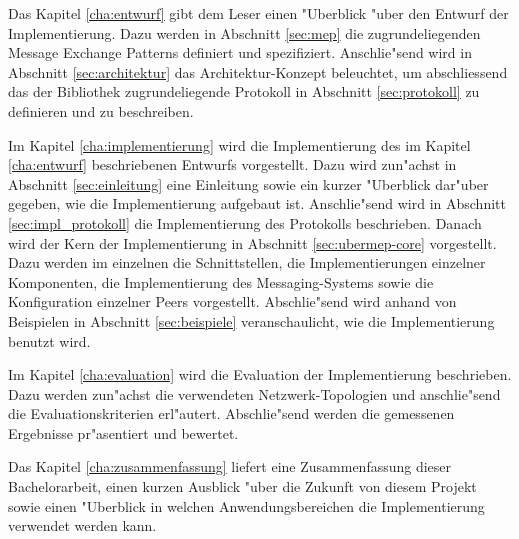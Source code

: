 Das Kapitel \ref{cha:entwurf} gibt dem Leser einen "Uberblick "uber den Entwurf der Implementierung. Dazu werden in Abschnitt \ref{sec:mep} die zugrundeliegenden Message Exchange Patterns definiert und spezifiziert. Anschlie"send wird in Abschnitt \ref{sec:architektur} das Architektur-Konzept beleuchtet, um abschliessend das der Bibliothek zugrundeliegende Protokoll in Abschnitt \ref{sec:protokoll} zu definieren und zu beschreiben.

Im Kapitel \ref{cha:implementierung} wird die Implementierung des im Kapitel \ref{cha:entwurf} beschriebenen Entwurfs vorgestellt. Dazu wird zun"achst in Abschnitt \ref{sec:einleitung} eine Einleitung sowie ein kurzer "Uberblick dar"uber gegeben, wie die Implementierung aufgebaut ist. Anschlie"send wird in Abschnitt \ref{sec:impl_protokoll} die Implementierung des Protokolls beschrieben. Danach wird der Kern der Implementierung in Abschnitt \ref{sec:ubermep-core} vorgestellt. Dazu werden im einzelnen die Schnittstellen, die Implementierungen einzelner Komponenten, die Implementierung des Messaging-Systems sowie die Konfiguration einzelner Peers vorgestellt. Abschlie"send wird anhand von Beispielen in Abschnitt \ref{sec:beispiele} veranschaulicht, wie die Implementierung benutzt wird.

Im Kapitel \ref{cha:evaluation} wird die Evaluation der Implementierung beschrieben. Dazu werden zun"achst die verwendeten Netzwerk-Topologien und anschlie"send die Evaluationskriterien erl"autert. Abschlie"send werden die gemessenen Ergebnisse pr"a\-sen\-tiert und bewertet.

Das Kapitel \ref{cha:zusammenfassung} liefert eine Zusammenfassung dieser Bachelorarbeit, einen kurzen Ausblick "uber die Zukunft von diesem Projekt sowie einen "Uberblick in welchen Anwendungsbereichen die Implementierung verwendet werden kann.